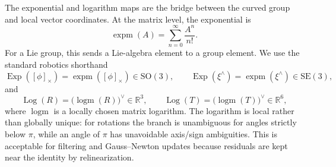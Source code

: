 \documentclass[11pt]{report}
\newcommand{\SO}{\mathrm{SO}(3)}
\newcommand{\SE}{\mathrm{SE}(3)}
\newcommand{\R}{\mathbb{R}}
\newcommand{\Exp}{\operatorname{Exp}}
\newcommand{\Log}{\operatorname{Log}}
\begin{document}
The exponential and logarithm maps are the bridge between the curved group and local vector coordinates. At the matrix level, the exponential is
\begin{equation}
\operatorname{expm}(A)=\sum_{n=0}^{\infty}\frac{A^n}{n!}.
\end{equation}
For a Lie group, this sends a Lie-algebra element to a group element. We use the standard robotics shorthand
\begin{equation}
\Exp([\phi]_\times)=\operatorname{expm}([\phi]_\times)\in\SO,\qquad
\Exp(\xi^\wedge)=\operatorname{expm}(\xi^\wedge)\in\SE,
\end{equation}
and
\begin{equation}
\Log(R)=\bigl(\operatorname{logm}(R)\bigr)^\vee\in\R^3,\qquad
\Log(T)=\bigl(\operatorname{logm}(T)\bigr)^\vee\in\R^6,
\end{equation}
where $\operatorname{logm}$ is a locally chosen matrix logarithm. The logarithm is local rather than globally unique: for rotations the branch is unambiguous for angles strictly below $\pi$, while an angle of $\pi$ has unavoidable axis/sign ambiguities. This is acceptable for filtering and Gauss--Newton updates because residuals are kept near the identity by relinearization.
\end{document}
